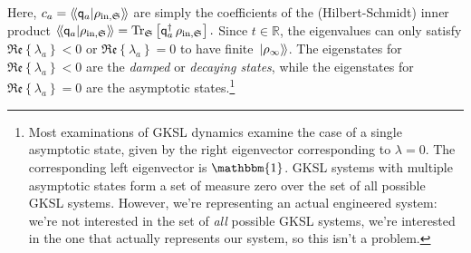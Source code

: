 \documentclass[preprints,article,accept,moreauthors,pdftex]{Definitions/mdpi}
\begin{document}
\begin{paracol}{2}
Here, $c_{a} = \left\langle\!\Braket{\mathsf{q}_{a}\!|\!\rho_{\mathrm{in},\mathfrak{S}}}\!\right\rangle$ are simply the coefficients of the (Hilbert-Schmidt) inner product $\left\langle\!\Braket{\mathsf{q}_{a}\!|\!\rho_{\mathrm{in},\mathfrak{S}}}\!\right\rangle = \mathrm{Tr}_{\mathfrak{S}}\left[\mathsf{q}_{a}^{\dagger}\,\rho_{\mathrm{in},\mathfrak{S}}\right].$ Since $t\in\mathbb{R}$, the eigenvalues can only satisfy $\mathfrak{Re}\left\{\lambda_{a}\right\} < 0$ or $\mathfrak{Re}\left\{\lambda_{a}\right\} = 0$ to have finite $\left.\ket{\rho_{\infty}}\!\right\rangle$. The eigenstates for $\mathfrak{Re}\left\{\lambda_{a}\right\} < 0$ are the \emph{damped} or \emph{decaying states}, while the eigenstates for $\mathfrak{Re}\left\{\lambda_{a}\right\} = 0$ are the asymptotic states.\footnote{Most examinations of GKSL dynamics examine the case of a single asymptotic state, given by the right eigenvector corresponding to $\lambda = 0$. The corresponding left eigenvector is $\mathbbm{1}$. GKSL systems with multiple asymptotic states form a set of measure zero \cite{Albert18} over the set of all possible GKSL systems. However, we're representing an actual engineered system: we're not interested in the set of \emph{all} possible GKSL systems, we're interested in the one that actually represents our system, so this isn't a problem.}


\end{paracol}
\end{document}
